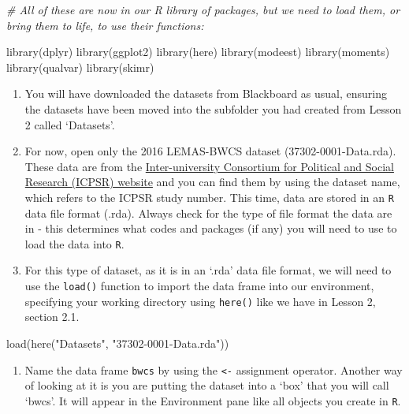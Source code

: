 \documentclass[
]{book}
\newenvironment{Shaded}{\begin{snugshade}}{\end{snugshade}}
\newcommand{\CommentTok}[1]{\textcolor[rgb]{0.56,0.35,0.01}{\textit{#1}}}
\newcommand{\FunctionTok}[1]{\textcolor[rgb]{0.00,0.00,0.00}{#1}}
\newcommand{\NormalTok}[1]{#1}
\newcommand{\StringTok}[1]{\textcolor[rgb]{0.31,0.60,0.02}{#1}}
\providecommand{\tightlist}{%
  \setlength{\itemsep}{0pt}\setlength{\parskip}{0pt}}
\begin{document}
\begin{Shaded}
\begin{Highlighting}[]
\CommentTok{\# All of these are now in our R library of packages, but we need to load them, or \textquotesingle{}bring them to life\textquotesingle{}, to use their functions:}

\FunctionTok{library}\NormalTok{(dplyr)}
\FunctionTok{library}\NormalTok{(ggplot2)}
\FunctionTok{library}\NormalTok{(here)}
\FunctionTok{library}\NormalTok{(modeest)}
\FunctionTok{library}\NormalTok{(moments)}
\FunctionTok{library}\NormalTok{(qualvar)}
\FunctionTok{library}\NormalTok{(skimr)}
\end{Highlighting}
\end{Shaded}

\begin{enumerate}
\def\labelenumi{\arabic{enumi}.}
\setcounter{enumi}{2}
\item
  You will have downloaded the datasets from Blackboard as usual, ensuring the datasets have been moved into the subfolder you had created from Lesson 2 called `Datasets'.
\item
  For now, open only the 2016 LEMAS-BWCS dataset (37302-0001-Data.rda). These data are from the \href{https://www.icpsr.umich.edu/web/pages/}{Inter-university Consortium for Political and Social Research (ICPSR) website} and you can find them by using the dataset name, which refers to the ICPSR study number. This time, data are stored in an \texttt{R} data file format (.rda). Always check for the type of file format the data are in - this determines what codes and packages (if any) you will need to use to load the data into \texttt{R}.
\item
  For this type of dataset, as it is in an `.rda' data file format, we will need to use the \texttt{load()} function to import the data frame into our environment, specifying your working directory using \texttt{here()} like we have in Lesson 2, section 2.1.
\end{enumerate}

\begin{Shaded}
\begin{Highlighting}[]
\FunctionTok{load}\NormalTok{(}\FunctionTok{here}\NormalTok{(}\StringTok{"Datasets"}\NormalTok{, }\StringTok{"37302{-}0001{-}Data.rda"}\NormalTok{))}
\end{Highlighting}
\end{Shaded}

\begin{enumerate}
\def\labelenumi{\arabic{enumi}.}
\setcounter{enumi}{5}
\tightlist
\item
  Name the data frame \texttt{bwcs} by using the \texttt{\textless{}-} assignment operator. Another way of looking at it is you are putting the dataset into a `box' that you will call `bwcs'. It will appear in the Environment pane like all objects you create in \texttt{R}.
\end{enumerate}
\end{document}
